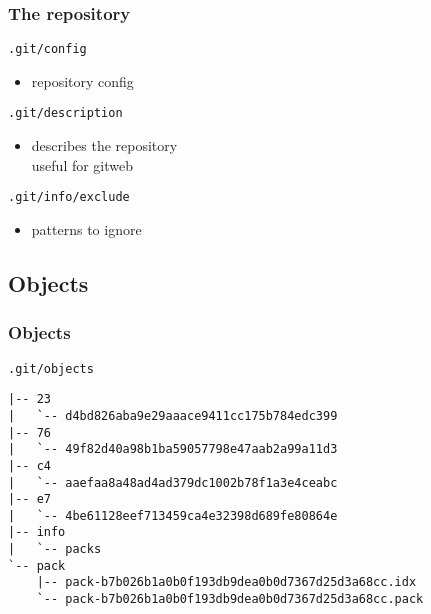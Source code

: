 \documentclass[english]{beamer}
\newcommand{\mysubsection}[2]{%
  \hypertarget{#2}{}%
  \subsection{#1}%
  \label{#2}%
}
\newcommand{\CMD}[1]{%
\texttt{\textcolor{code-green}{#1}}%
}
\newcommand{\faint}[1]{%
\textcolor{code-gray}{#1}%
}
\begin{document}
\begin{frame}[fragile]
\frametitle{The repository}

\CMD{.git/config} \\
\begin{itemize}
        \item repository config
\end{itemize}

\pause{}
\vspace{.1\textheight}
\CMD{.git/description} \\
\begin{itemize}
        \item describes the repository \\
                \faint{useful for gitweb}
\end{itemize}

\pause{}
\vspace{.1\textheight}
\CMD{.git/info/exclude} \\
\begin{itemize}
        \item patterns to ignore
\end{itemize}

\end{frame}

\mysubsection{Objects}{using:objects}
\begin{frame}[fragile]
\frametitle{Objects}
\CMD{.git/objects}
{\small
\begin{Verbatim}[commandchars=\\\{\}]
|-- 23
|   `-- d4bd826aba9e29aaace9411cc175b784edc399
|-- 76
|   `-- 49f82d40a98b1ba59057798e47aab2a99a11d3
|-- c4
|   `-- aaefaa8a48ad4ad379dc1002b78f1a3e4ceabc
|-- e7
|   `-- 4be61128eef713459ca4e32398d689fe80864e
|-- info
|   `-- packs
`-- pack
    |-- pack-b7b026b1a0b0f193db9dea0b0d7367d25d3a68cc.idx
    `-- pack-b7b026b1a0b0f193db9dea0b0d7367d25d3a68cc.pack
\end{Verbatim}
}
\vspace{\textheight}
\end{frame}
\end{document}
